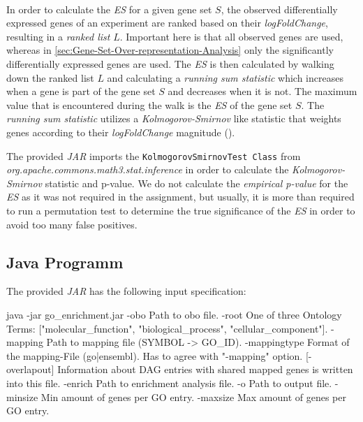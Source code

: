 \documentclass[12pt]{article}
\begin{document}
\hspace{1mm}\\
In order to calculate the \textit{ES} for a given gene set $S$,
the observed differentially expressed genes of an experiment are ranked
based on their \textit{logFoldChange}, resulting in a \textit{ranked list} $L$.
Important here is that all observed genes are used, whereas in 
\ref{sec:Gene-Set-Over-representation-Analysis} only the significantly differentially 
expressed genes are used. 
The \textit{ES} is then calculated by walking down the ranked list $L$ and
calculating a \textit{running sum statistic} which increases when a gene
is part of the gene set $S$ and decreases when it is not.
The maximum value that is encountered during the walk is the \textit{ES} of the gene set $S$.
The \textit{running sum statistic} utilizes a \textit{Kolmogorov-Smirnov} like statistic 
that weights genes according to their \textit{logFoldChange} magnitude (\cite{GSEA}).

The provided \textit{JAR} imports the \texttt{KolmogorovSmirnovTest Class} from \\
\textit{org.apache.commons.math3.stat.inference} in order to calculate the
\textit{Kolmogorov-Smirnov} statistic and p-value.
We do not calculate the \textit{empirical p-value} for the \textit{ES} as it was 
not required in the assignment, but usually, it is more than required to
run a permutation test to determine the true significance of the \textit{ES}
in order to avoid too many false positives.

\newpage
\subsection{Java Programm}\label{sec:Java-Programm}
The provided \textit{JAR} has the following input specification:
\begin{verbatim*}
java -jar go_enrichment.jar
  -obo                   Path to obo file.
  -root                  One of three Ontology Terms:
                         ["molecular_function",
                         "biological_process",
                         "cellular_component"].
  -mapping               Path to mapping file (SYMBOL -> GO_ID).
  -mappingtype           Format of the mapping-File (go|ensembl). 
                         Has to agree with "-mapping" option.
  [-overlapout]          Information about DAG  entries  with shared mapped
                         genes is written into this file.
  -enrich                Path to enrichment analysis file.
  -o                     Path to output file.
  -minsize               Min amount of genes per GO entry.
  -maxsize               Max amount of genes per GO entry.
\end{verbatim*}
\end{document}
